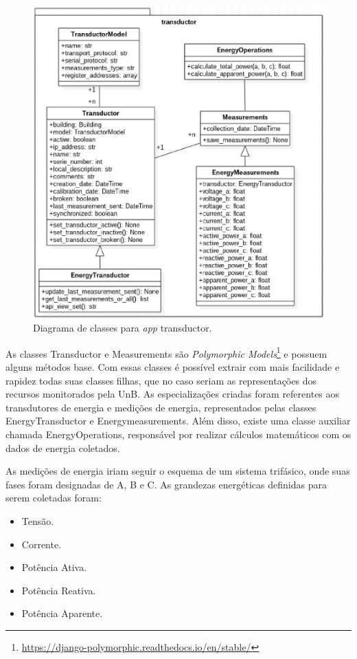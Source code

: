 \begin{figure}[!h]
    \centering
    \includegraphics[keepaspectratio=true,scale=0.7]{figuras/transductor.eps}
    \caption{Diagrama de classes para \textit{app} transductor.}
    \label{transductor}
\end{figure}

As classes Transductor e Measurements são \textit{Polymorphic Models}\footnote{\url{https://django-polymorphic.readthedocs.io/en/stable/}} e possuem alguns métodos base. Com essas classes é possível extrair com mais facilidade e rapidez todas suas classes filhas, que no caso seriam as representações dos recursos monitorados pela UnB. As especializações criadas foram referentes aos transdutores de energia e medições de energia, representados pelas classes EnergyTransductor e Energymeasurements. Além disso, existe uma classe auxiliar chamada EnergyOperations, responsável por realizar cálculos matemáticos com os dados de energia coletados.

As medições de energia iriam seguir o esquema de um sistema trifásico, onde suas fases foram designadas de A, B e C. As grandezas energéticas definidas para serem coletadas foram:

\begin{itemize}
    \item Tensão.
    \item Corrente.
    \item Potência Ativa.
    \item Potência Reativa.
    \item Potência Aparente.
\end{itemize}

